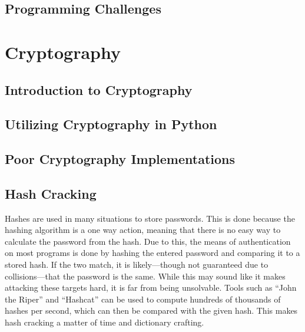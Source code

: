\documentclass[a4paper,11pt]{report}
\begin{document}
	\section{Programming Challenges}
\chapter{Cryptography}
	\label{ch:Cryptography}
	\section{Introduction to Cryptography}
	\section{Utilizing Cryptography in Python}
	\section{Poor Cryptography Implementations}
	\section{Hash Cracking}
		Hashes are used in many situations to store passwords. 
		This is done because the hashing algorithm is a one way action, meaning that there is no easy way to calculate the password from the hash. 
		Due to this, the means of authentication on most programs is done by hashing the entered password and comparing it to a stored hash. 
		If the two match, it is likely---though not guaranteed due to collisions---that the password is the same. 
		While this may sound like it makes attacking these targets hard, it is far from being unsolvable. 
		Tools such as ``John the Riper'' and ``Hashcat'' can be used to compute hundreds of thousands of hashes per second, which can then be compared with the given hash. 
		This makes hash cracking a matter of time and dictionary crafting. 
\end{document}
